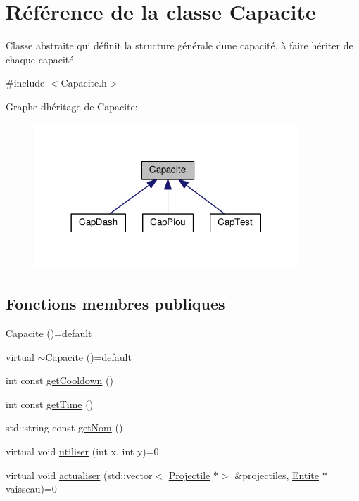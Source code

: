 \hypertarget{class_capacite}{}\section{Référence de la classe Capacite}
\label{class_capacite}


Classe abstraite qui définit la structure générale d\textquotesingle{}une capacité, à faire hériter de chaque capacité  




{\ttfamily \#include $<$Capacite.\+h$>$}



Graphe d\textquotesingle{}héritage de Capacite\+:\nopagebreak
\begin{figure}[H]
\begin{center}
\leavevmode
\includegraphics[width=282pt]{class_capacite__inherit__graph}
\end{center}
\end{figure}
\subsection*{Fonctions membres publiques}
\begin{DoxyCompactItemize}
\item 
\hyperlink{class_capacite_a8a1aebc5b2332e366a3f207c23b4d363}{Capacite} ()=default
\item 
virtual \hyperlink{class_capacite_a687ff139afef118ebb63b897861674fd}{$\sim$\+Capacite} ()=default
\item 
int const \hyperlink{class_capacite_a1842888fc39a0054d3cc9d7236ab1191}{get\+Cooldown} ()
\item 
int const \hyperlink{class_capacite_a82e4eebf522c02163725872b288bfcf8}{get\+Time} ()
\item 
std\+::string const \hyperlink{class_capacite_a96218b289768ff461ffaaa0abe014a42}{get\+Nom} ()
\item 
virtual void \hyperlink{class_capacite_a4d4f643987fcc2168567bf28a36ea418}{utiliser} (int x, int y)=0
\item 
virtual void \hyperlink{class_capacite_a7d4e86c20cd198960f25c0eb443148fe}{actualiser} (std\+::vector$<$ \hyperlink{class_projectile}{Projectile} $\ast$$>$ \&projectiles, \hyperlink{class_entite}{Entite} $\ast$vaisseau)=0
\end{DoxyCompactItemize}
